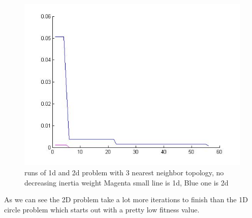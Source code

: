\documentclass[12pt, a4paper]{article}
\begin{document}
\begin{figure}[H]

\includegraphics[width=\linewidth]{3nn_no_inertia}
\caption{runs of 1d and 2d problem with 3 nearest neighbor topology, no decreasing inertia weight
Magenta small line is 1d, Blue one is 2d}
\end{figure}
As we can see the 2D problem take a lot more iterations to finish than the 1D circle problem which starts out with a pretty low fitness value.
\end{document}
